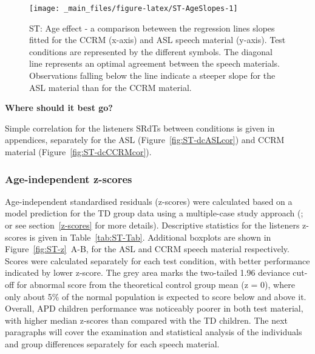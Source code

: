 \documentclass[a4paper, twoside]{templates/ociamthesis}
\begin{document}
\begin{figure}

{\centering \texttt{[image: \_main\_files/figure-latex/ST-AgeSlopes-1]} 

}

\caption{ST: Age effect - a comparison beteween the regression lines slopes fitted for the CCRM (x-axis) and ASL speech material (y-axis). Test conditions are represented by the different symbols. The diagonal line represents an optimal agreement between the speech materials. Observations falling below the line indicate a steeper slope for the ASL material than for the CCRM material.}\label{fig:ST-AgeSlopes}
\end{figure}

\begin{correction}
\textbf{Where should it best go?}

Simple correlation for the listeners SRdTs between conditions is given
in appendices, separately for the ASL (Figure~\ref{fig:ST-dcASLcor}) and
CCRM material (Figure~\ref{fig:ST-dcCCRMcor}).
\end{correction}

\hypertarget{age-independent-z-scores}{%
\subsubsection*{Age-independent z-scores}\label{age-independent-z-scores}}

Age-independent standardised residuals (z-scores) were calculated based on a model prediction for the TD group data using a multiple-case study approach (\textcite{Ramus2003}; or see section~\ref{z-scores} for more details). Descriptive statistics for the listeners z-scores is given in Table~\ref{tab:ST-Tab}. Additional boxplots are shown in Figure~\ref{fig:ST-z}~A-B, for the ASL and CCRM speech material respectively. Scores were calculated separately for each test condition, with better performance indicated by lower z-score. The grey area marks the two-tailed 1.96 deviance cut-off for abnormal score from the theoretical control group mean (z = 0), where only about 5\% of the normal population is expected to score below and above it. Overall, APD children performance was noticeably poorer in both test material, with higher median z-scores than compared with the TD children. The next paragraphs will cover the examination and statistical analysis of the individuals and group differences separately for each speech material.\\
\end{document}
